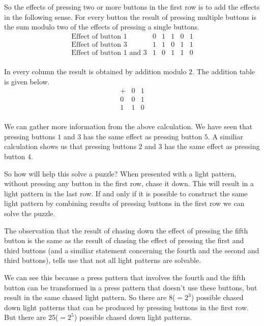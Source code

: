 So the effects of pressing two or more buttons in the first row is to add the
effects in the following sense. For every button the result of pressing multiple
buttons is the sum modulo two of the effects of pressing a single buttons.
\[
	\begin{array}{cccccc}
		\text{Effect of button } 1                 & 0 & 1 & 1 & 0 & 1 \\
		\text{Effect of button } 3                 & 1 & 1 & 0 & 1 & 1 \\
		\hline
		\text{Effect of button } 1 \text{ and } 3  & 1 & 0 & 1 & 1 & 0 \\
	\end{array}
\]

In every column the result is obtained by addition modulo $2$. The addition
table is given below.
\[
	\begin{array}{c|cc}
		+ & 0 & 1 \\
		\hline
		0 & 0 & 1 \\
		1 & 1 & 0 \\
	\end{array}
\]

We can gather more information from the above calculation. We have seen that
pressing buttons $1$ and $3$ has the same effect as pressing button $5$. A
similiar calculation shows us that pressing buttons $2$ and $3$ has the same
effect as pressing button $4$.

So how will help this solve a puzzle? When presented with a light pattern,
without pressing any button in the first row, chase it down. This will result in
a light pattern in the last row. If and only if it is possible to construct the
same light pattern by combining results of pressing buttons in the first row we
can solve the puzzle.

The observation that the result of chasing down the effect of pressing the
fifth button is the same as the result of chasing the effect of pressing the
first and third buttons (and a similiar statement concerning the fourth and the
second and third buttons), tells use that not all light patterns are solvable.

We can see this because a press pattern that involves the fourth and the fifth
button can be transformed in a press pattern that doesn't use these buttons,
but result in the same chased light pattern. So there are 8($=2^3$) possible
chased down light patterns that can be produced by pressing buttons in the first
row. But there are 25($=2^5$) possible chased down light patterns.

